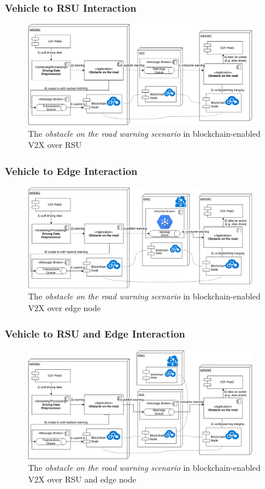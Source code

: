 \documentclass{beamer}
\begin{document}
	\begin{frame}
		\frametitle{Vehicle to \gls{RSU} Interaction}
		\begin{figure}
			\centering
			\includegraphics[width=0.9\textwidth]{figures/bc_interactions/bc_interaction_veh_rsu_veh.png}
			\caption{The \textit{obstacle on the road warning scenario} in blockchain-enabled \gls{V2X} over \gls{RSU}}
			\label{fig:interaction_v2x_rsu}
		\end{figure}
	\end{frame}

	\begin{frame}
		\frametitle{Vehicle to Edge Interaction}
		\begin{figure}
			\centering
			\includegraphics[width=0.9\textwidth]{figures/bc_interactions/bc_interaction_veh_edge_veh.png}
			\caption{The \textit{obstacle on the road warning scenario} in blockchain-enabled \gls{V2X} over edge node}
			\label{fig:interaction_v2x_edge}
		\end{figure}
	\end{frame}

	\begin{frame}
		\frametitle{Vehicle to \gls{RSU} and Edge Interaction}
		\begin{figure}
			\centering
			\includegraphics[width=0.9\textwidth]{figures/bc_interactions/bc_interaction_veh_rsu_edge_veh.png}
			\caption{The \textit{obstacle on the road warning scenario} in blockchain-enabled \gls{V2X} over \gls{RSU} and edge node}
			\label{fig:interaction_v2x_rsu_edge}
		\end{figure}
	\end{frame}
\end{document}
